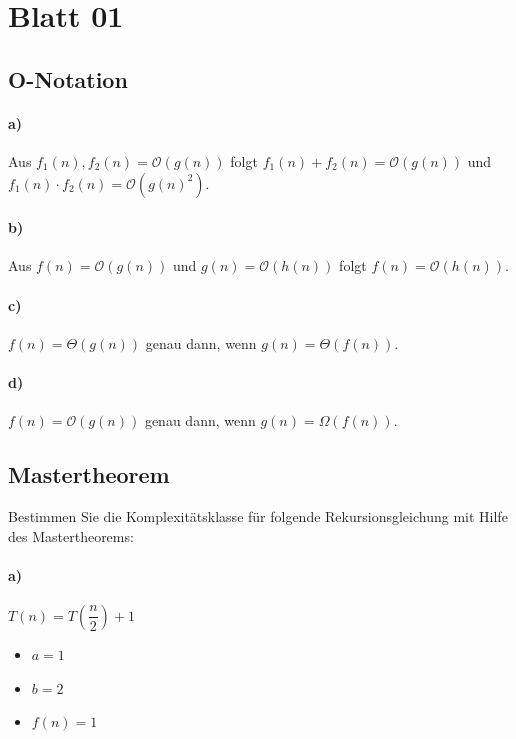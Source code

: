 \documentclass[paper=a4, fontsize=11pt]{scrartcl}
\numberwithin{equation}{section}
\numberwithin{figure}{section}
\numberwithin{table}{section}
\begin{document}
\section{Blatt 01}
\subsection{O-Notation}
\paragraph{a)}

Aus $f_{1}(n), f_{2}(n) = \mathcal{O}(g(n))$ folgt $f_{1}(n) + f_{2}(n) = \mathcal{O}(g(n))$ und $f_{1}(n) \cdot f_{2}(n) = \mathcal{O}(g(n)^{2})$. \\

\paragraph{b)}
Aus $f(n) = \mathcal{O}(g(n))$ und $g(n) = \mathcal{O}(h(n))$ folgt $f(n) = \mathcal{O}(h(n))$. \\

\paragraph{c)}
$f(n) = \Theta (g(n))$ genau dann, wenn $g(n) = \Theta (f(n))$. \\

\paragraph{d)}
$f(n) = \mathcal{O} (g(n))$ genau dann, wenn $g(n) = \Omega (f(n))$. \\

\subsection{Mastertheorem}
Bestimmen Sie die Komplexitätsklasse für folgende Rekursionsgleichung mit Hilfe des Mastertheorems:

\paragraph{a)}
$T(n) = T( \dfrac{n}{2}) + 1$

\begin{itemize}
\item $a = 1$
\item $b = 2$
\item $f(n) = 1$
\end{itemize}
\end{document}
